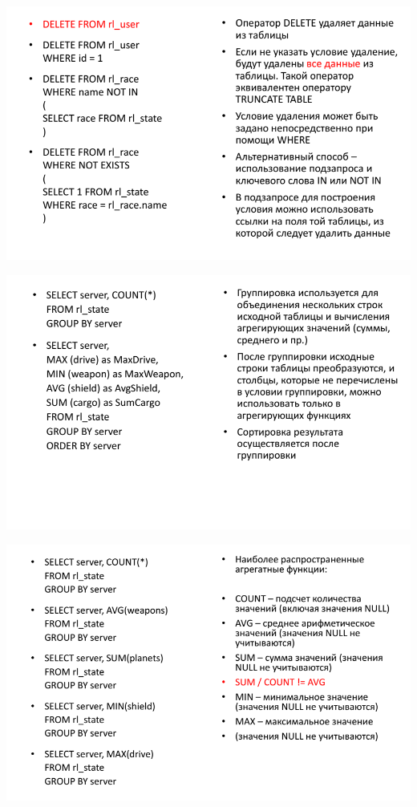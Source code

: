 \documentclass{beamer}
\begin{document}
\begin{frame}
	\begin{center}
		\includegraphics[scale=0.5]{images/delete-01.png}
	\end{center}
\end{frame} 

\begin{frame}
	\begin{center}
		\includegraphics[scale=0.5]{images/group.png}
	\end{center}
\end{frame} 

\begin{frame}
	\begin{center}
		\includegraphics[scale=0.5]{images/avg.png}
	\end{center}
\end{frame} 
\end{document}

